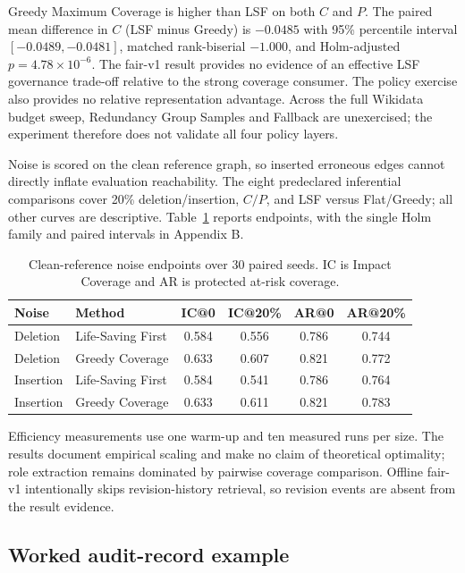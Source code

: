 \documentclass[pdflatex,sn-basic]{sn-jnl}
\begin{document}
Greedy Maximum Coverage is higher than LSF on both $C$ and $P$. The paired mean difference in $C$ (LSF minus Greedy) is $-0.0485$ with 95\% percentile interval $[-0.0489,-0.0481]$, matched rank-biserial $-1.000$, and Holm-adjusted $p=4.78\times10^{-6}$. The fair-v1 result provides no evidence of an effective LSF governance trade-off relative to the strong coverage consumer. The policy exercise also provides no relative representation advantage. Across the full Wikidata budget sweep, Redundancy Group Samples and Fallback are unexercised; the experiment therefore does not validate all four policy layers.

Noise is scored on the clean reference graph, so inserted erroneous edges cannot directly inflate evaluation reachability. The eight predeclared inferential comparisons cover 20\% deletion/insertion, $C/P$, and LSF versus Flat/Greedy; all other curves are descriptive. Table~\ref{tab:wikidata-noise} reports endpoints, with the single Holm family and paired intervals in Appendix B.

\begin{table}[t]
\caption{Clean-reference noise endpoints over 30 paired seeds. IC is Impact Coverage and AR is protected at-risk coverage.}
\label{tab:wikidata-noise}
\centering
\small
\begin{tabular}{llcccc}
\toprule
Noise & Method & IC@0 & IC@20\% & AR@0 & AR@20\% \\
\midrule
Deletion & Life-Saving First & 0.584 & 0.556 & 0.786 & 0.744 \\
Deletion & Greedy Coverage & 0.633 & 0.607 & 0.821 & 0.772 \\
Insertion & Life-Saving First & 0.584 & 0.541 & 0.786 & 0.764 \\
Insertion & Greedy Coverage & 0.633 & 0.611 & 0.821 & 0.783 \\
\bottomrule
\end{tabular}
\end{table}

Efficiency measurements use one warm-up and ten measured runs per size. The results document empirical scaling and make no claim of theoretical optimality; role extraction remains dominated by pairwise coverage comparison. Offline fair-v1 intentionally skips revision-history retrieval, so revision events are absent from the result evidence.

\FloatBarrier
\subsection{Worked audit-record example}
\end{document}
